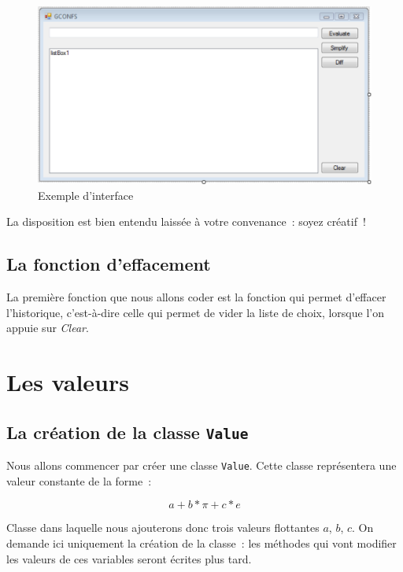 \documentclass[12pt,a4paper]{report}
\begin{document}
\begin{figure}[ht]
	\begin{center}
		\includegraphics[scale=0.5]{form1}
		\caption{Exemple d'interface}
		\label{fig:form1}
	\end{center}
\end{figure}

La disposition est bien entendu laissée à votre convenance~: soyez créatif~!

\subsection{La fonction d'effacement}

La première fonction que nous allons coder est la fonction qui permet d'effacer l'historique, c'est-à-dire celle qui permet de vider la liste de choix, lorsque l'on appuie sur \textit{Clear}.




\section{Les valeurs}

\subsection{La création de la classe \texttt{Value}}

Nous allons commencer par créer une classe \texttt{Value}. Cette classe représentera une valeur constante de la forme~:

$$a+b*\pi+c*e$$

Classe dans laquelle nous ajouterons donc trois valeurs flottantes $a$, $b$, $c$. On demande ici uniquement la création de la classe~: les méthodes qui vont modifier les valeurs de ces variables seront écrites plus tard.
\end{document}
